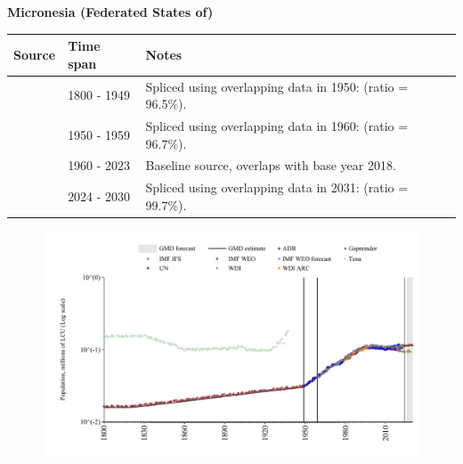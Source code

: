 \documentclass[12pt,a4paper,landscape]{article}
\begin{document}
\begin{adjustbox}{max totalsize={\paperwidth}{\paperheight},center}
\begin{minipage}[t][\textheight][t]{\textwidth}
\vspace*{0.5cm}
{}
\begin{center}
{\Large\bfseries Micronesia (Federated States of)}
\end{center}
\vspace{0.5cm}
\begin{table}[H]
\centering
\small
\begin{tabular}{|l|l|l|}
\hline
\textbf{Source} & \textbf{Time span} & \textbf{Notes} \\
\hline
\rowcolor{white}\cite{Gapminder}& 1800 - 1949 &Spliced using overlapping data in 1950: (ratio = 96.5\%).\\
\rowcolor{lightgray}\cite{IMF_IFS}& 1950 - 1959 &Spliced using overlapping data in 1960: (ratio = 96.7\%).\\
\rowcolor{white}\cite{WDI}& 1960 - 2023 &Baseline source, overlaps with base year 2018.\\
\rowcolor{lightgray}\cite{Gapminder}& 2024 - 2030 &Spliced using overlapping data in 2031: (ratio = 99.7\%).\\
\hline
\end{tabular}
\end{table}
\begin{figure}[H]
\centering
\includegraphics[width=\textwidth,height=0.6\textheight,keepaspectratio]{graphs/FSM_pop.pdf}
\end{figure}
\end{minipage}
\end{adjustbox}
\end{document}

